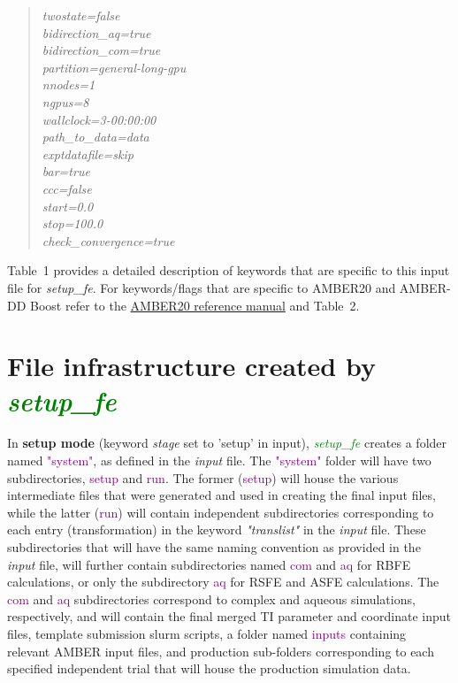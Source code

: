 \documentclass[11pt,letterpaper,titlepage]{article}
\newenvironment{itquote}
  {\begin{quote}\itshape}
  {\end{quote}\ignorespacesafterend}
\begin{document}
\begin{itquote}
{twostate=false 					\\
bidirection\_aq=true 				\\
bidirection\_com=true 				\\

partition=general-long-gpu       		\\
nnodes=1                        		\\
ngpus=8                        			\\
wallclock=3-00:00:00          			\\

path\_to\_data=data 				\\
exptdatafile=skip 				\\
bar=true 					\\
ccc=false 					\\
start=0.0 					\\
stop=100.0 					\\
check\_convergence=true 			\\

}

\end{itquote}

Table~1 provides a detailed description of keywords that are specific to this input file for 
\textit{setup\_fe}. 
For keywords/flags that are specific to AMBER20 and AMBER-DD Boost refer to the 
\href{https://ambermd.org/doc12/Amber20.pdf}{AMBER20 reference manual}
and Table~2.

\vspace{0.1cm}
\section{File infrastructure created by \textcolor{green}{\textit{setup\_fe}}}
\vspace{0.1cm}

In \textbf{setup mode} (keyword \textit{stage} set to 'setup' in input), 
\textcolor{green}{\textit{setup\_fe}} creates a folder named \textcolor{purple}{"system"}, as defined 
in the \textit{input} file. 
The \textcolor{purple}{"system"} folder will have two subdirectories, \textcolor{purple}{setup} 
and \textcolor{purple}{run}. The former (\textcolor{purple}{setup}) will house the  various intermediate 
files that were generated and used in creating 
the final input files, while the latter (\textcolor{purple}{run}) will contain 
independent subdirectories corresponding 
to each entry (transformation) in the keyword \textit{"translist"} in the \textit{input} file. These 
subdirectories that will have the same naming convention as provided in the \textit{input} file, 
will further contain subdirectories named \textcolor{purple}{com} and \textcolor{purple}{aq} for 
RBFE calculations, or only the subdirectory \textcolor{purple}{aq} for RSFE and ASFE calculations. 
The \textcolor{purple}{com} and \textcolor{purple}{aq}
subdirectories correspond to complex and aqueous simulations, respectively, and will contain 
the final merged TI parameter and coordinate input files, template submission slurm scripts, a folder
named \textcolor{purple}{inputs} containing relevant AMBER input files, and production sub-folders corresponding 
to each specified independent trial that will house the production simulation data. 
\end{document}
